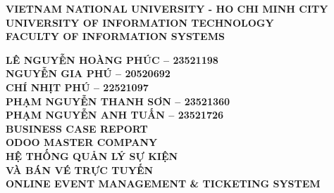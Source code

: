 \documentclass[13pt,a4paper]{extreport} %
\begin{document}
\begin{titlepage}

    \centering

    {\fontsize{14pt}{16.8pt}\selectfont\bfseries VIETNAM NATIONAL UNIVERSITY - HO CHI MINH CITY}\\[0.2cm]
    {\fontsize{16pt}{19.2pt}\selectfont\bfseries UNIVERSITY OF INFORMATION TECHNOLOGY}\\[0.2cm]
    {\fontsize{16pt}{19.2pt}\selectfont\bfseries FACULTY OF INFORMATION SYSTEMS}\\[1.5cm]

    \vspace{1.5cm} %

    {\fontsize{14pt}{16.8pt}\selectfont\bfseries LÊ NGUYỄN HOÀNG PHÚC – 23521198}\\[0.4cm]
    {\fontsize{14pt}{16.8pt}\selectfont\bfseries NGUYỄN GIA PHÚ – 20520692}\\[0.5cm]
    {\fontsize{14pt}{16.8pt}\selectfont\bfseries CHÍ NHỊT PHÚ – 22521097}\\[0.4cm]
    {\fontsize{14pt}{16.8pt}\selectfont\bfseries PHẠM NGUYỄN THANH SƠN – 23521360}\\[0.5cm]
    {\fontsize{14pt}{16.8pt}\selectfont\bfseries PHẠM NGUYỄN ANH TUẤN – 23521726}\\[0.6cm]
    
    {\fontsize{16pt}{19.2pt}\selectfont\bfseries BUSINESS CASE REPORT}\\[0.6cm]
    {\fontsize{16pt}{19.2pt}\selectfont\bfseries ODOO MASTER COMPANY}\\[0.3cm]
    {\fontsize{22pt}{26.4pt}\selectfont\bfseries HỆ THỐNG QUẢN LÝ SỰ KIỆN\\VÀ BÁN VÉ TRỰC TUYẾN}\\[0.5cm]
    {\color{red}\fontsize{16pt}{19.2pt}\selectfont\bfseries ONLINE EVENT MANAGEMENT \& TICKETING SYSTEM}\\[2cm]


\end{titlepage}
\end{document}
